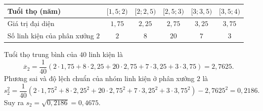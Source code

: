 \begin{bt}
{\begin{itemize}
			\begin{center}
			\begin{tabular}{|l|c|c|c|c|c|}
				\hline Tuổi thọ (năm) & {$[1{,}5 ; 2)$} & {$[2 ; 2{,}5)$} & {$[2{,}5 ; 3)$} & {$[3 ; 3{,}5)$} & {$[3{,}5 ; 4)$} \\	
				\hline Giá trị đại diện &$1{,}75$ & $2{,}25$ & $2{,}75$ & $3{,}25$ & $3{,}75$\\		
				\hline Số linh kiện của phân xưởng $2$ & $2$ & $8$ & $20$ & $7$ & $3$ \\					
				\hline
			\end{tabular}
		\end{center}
			Tuổi thọ trung bình của $40$ linh kiện là
			$$\overline{x}_2=\dfrac{1}{40}(2\cdot 1{,}75+8\cdot 2{,}25+20\cdot 2{,}75+7\cdot 3{,}25+3\cdot 3{,}75)=2{,}7625.$$
			Phương sai và độ lệch chuẩn	của nhóm linh kiện ở phân xưởng $2$ là
			$$s_2^2=\dfrac{1}{40}\left(2\cdot 1{,}75^2+8\cdot 2{,}25^2+20\cdot 2{,}75^2+7\cdot 3{,}25^2+3\cdot 3{,}75^2\right)-2{,}7625^2=0{,}2186. $$
			Suy ra $s_2=\sqrt{0{,}2186}=0{,}4675.$	
		\end{itemize}
	}
\end{bt}

